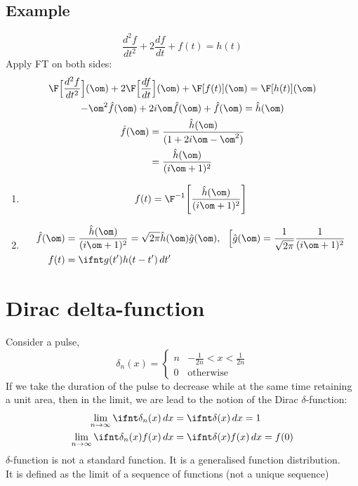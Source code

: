 \documentclass[a4paper, 11pt, normalem]{report}
\begin{document}
\subsection{Example}
\begin{equation*}
    \frac{d^2 f}{dt^2} + 2\frac{df}{dt} + f(t) = h(t)
\end{equation*}
Apply FT on both sides:
\begin{gather*}
    \F\Big[\frac{d^2 f}{dt^2}\Big](\om) + 2\F\Big[\frac{df}{dt}\Big](\om) + \F[f(t)](\om) = \F[h(t)](\om) \\
    -\om^2 \hat{f}(\om) + 2i\om \hat{f}(\om) + \hat{f}(\om) = \hat{h}(\om) \\
    \begin{aligned}
        \hat{f}(\om) &= \frac{\hat{h}(\om)}{(1 + 2i\om - \om^2)} \\
        &= \frac{\hat{h}(\om)}{(i\om + 1)^2}
    \end{aligned}
\end{gather*}
\begin{enumerate}
    \item   \begin{equation*}
                f(t) = \F^{-1}\Bigg[\frac{\hat{h}(\om)}{(i\om + 1)^2}\Bigg]
            \end{equation*}
    \item   \begin{align*}
                \hat{f}(\om) &= \frac{\hat{h}(\om)}{(i\om + 1)^2} = \sqrt{2\pi}\hat{h}(\om) \hat{g}(\om),~~ \Big[\hat{g}(\om) = \frac{1}{\sqrt{2\pi}} \frac{1}{(i\om + 1)^2} \\
                f(t) &= \ifnt g(t')h(t - t')\,dt'
            \end{align*}
\end{enumerate}

\section{Dirac delta-function}
Consider a pulse,
\begin{equation*}
    \delta_n (x) =  \begin{cases}
                        n & -\tfrac{1}{2n} < x < \tfrac{1}{2n} \\
                        0 & \text{otherwise}
                    \end{cases}
\end{equation*}
If we take the duration of the pulse to decrease while at the same time retaining a unit area, then in the limit, we are lead to the notion of the Dirac $\delta$-function:
\begin{align*}
    \lim_{n \to \infty} \ifnt \delta_n (x)\,dx &= \ifnt \delta(x)\,dx = 1 \\
    \lim_{n \to \infty} \ifnt \delta_n (x) f(x)\,dx &= \ifnt \delta(x)f(x)\,dx = f(0)
\end{align*}
$\delta$-function is not a standard function. It is a generalised function distribution. \\
It is defined as the limit of a sequence of functions (not a unique sequence)
\end{document}
